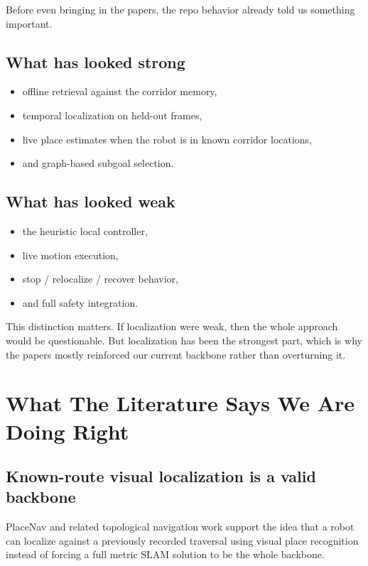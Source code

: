 \documentclass[11pt,a4paper]{article}
\begin{document}
Before even bringing in the papers, the repo behavior already told us
something important.

\subsection{What has looked strong}

\begin{itemize}[nosep]
  \item offline retrieval against the corridor memory,
  \item temporal localization on held-out frames,
  \item live place estimates when the robot is in known corridor locations,
  \item and graph-based subgoal selection.
\end{itemize}

\subsection{What has looked weak}

\begin{itemize}[nosep]
  \item the heuristic local controller,
  \item live motion execution,
  \item stop / relocalize / recover behavior,
  \item and full safety integration.
\end{itemize}

This distinction matters.  If localization were weak, then the whole approach
would be questionable.  But localization has been the strongest part, which is
why the papers mostly reinforced our current backbone rather than overturning it.

\section{What The Literature Says We Are Doing Right}

\subsection{Known-route visual localization is a valid backbone}

PlaceNav and related topological navigation work support the idea that a robot
can localize against a previously recorded traversal using visual place
recognition instead of forcing a full metric SLAM solution to be the whole
backbone.
\end{document}
